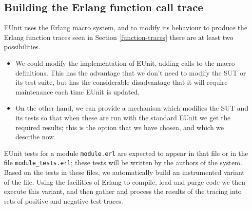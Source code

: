 \documentclass[]{sigplanconf}
\begin{document}
\subsection{Building the Erlang function call trace}

EUnit uses the Erlang macro system, and to modify its behaviour to produce the Erlang function traces seen in Section \ref{function-traces} there are at least two possibilities.
\begin{itemize}
\item
We could modify the implementation of EUnit, adding calls to the macro definitions. This has the advantage that we don't need to modify the SUT or its test suite, but has the considerable disadvantage that it will require maintenance each time EUnit is updated.
\item
On the other hand, we can provide a mechanism which modifies the SUT and its tests so that when these are run with the standard EUnit we get the required results; this is the option that we have chosen, and which we describe now.
\end{itemize}
EUnit tests for a module \texttt{module.erl} are expected to appear in that file or in the file \texttt{module\_tests.erl}; these tests will be written by the authors of the system. 
Based on the tests in these files, we automatically build an instrumented variant of the file. Using the facilities of Erlang to compile, load and purge code we then execute this variant, and then gather and process the results of the tracing into sets of positive and negative test traces.
\end{document}
